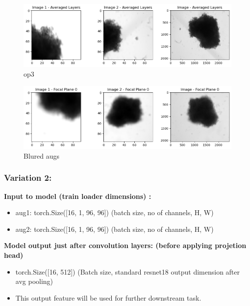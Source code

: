 \documentclass[a4paper,12pt]{report}
\begin{document}
  \begin{figure}[H]
    \centering
    \includegraphics[width=0.9\linewidth]{figures/output3.png} %
    \caption{op3}
    \label{fig:output3}
  \end{figure}

  \begin{figure}[H]
    \centering
    \includegraphics[width=0.9\linewidth]{figures/op4.png} %
    \caption{Blured augs}
    \label{fig:output4}
  \end{figure}
\subsubsection{Variation 2:}

\textbf{Input to model (train loader dimensions) :} 
\begin{itemize}
   \item aug1: torch.Size([16, 1, 96, 96])        (batch size, no of channels, H, W)
   \item aug2: torch.Size([16, 1, 96, 96])        (batch size, no of channels, H, W) \vspace{1em}
\end{itemize}
\textbf{Model output just after convolution layers: (before applying projetion head)} 
\begin{itemize}
  \item torch.Size([16, 512]) (Batch size, standard resnet18 output dimension after avg pooling)   
  \item This output feature will be used for further downstream task.  \vspace{1em}
\end{itemize}
\end{document}
